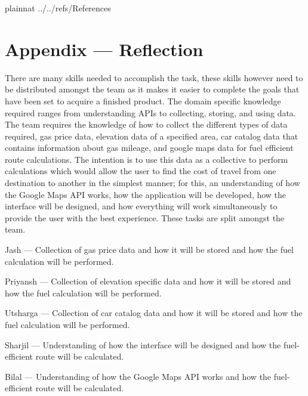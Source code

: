\documentclass[12pt]{article}
\begin{document}
\newpage

 {plainnat}
 {../../refs/References}

\newpage

\section*{Appendix --- Reflection}

There are many skills needed to accomplish the task, these skills however need to be distributed amongst the team as it makes it easier to complete the goals that have been set to acquire a finished product. The domain specific knowledge required ranges from understanding APIs to collecting, storing, and using data. The team requires the knowledge of how to collect the different types of data required, gas price data, elevation data of a specified area, car catalog data that contains information about gas mileage, and google maps data for fuel efficient route calculations. The intention is to use this data as a collective to perform calculations which would allow the user to find the cost of travel from one destination to another in the simplest manner; for this, an understanding of how the Google Maps API works, how the application will be developed, how the interface will be designed, and how everything will work simultaneously to provide the user with the best experience. These tasks are split amongst the team.

\bigskip

\noindent Jash --- Collection of gas price data and how it will be stored and how the fuel calculation will be performed.

\bigskip

\noindent Priyansh --- Collection of elevation specific data and how it will be stored and how the fuel calculation will be performed.

\bigskip

\noindent Utsharga --- Collection of car catalog data and how it will be stored and how the fuel calculation will be performed.

\bigskip

\noindent Sharjil --- Understanding of how the interface will be designed and how the fuel-efficient route will be calculated.

\bigskip

\noindent Bilal --- Understanding of how the Google Maps API works and how the fuel-efficient route will be calculated.
\end{document}
